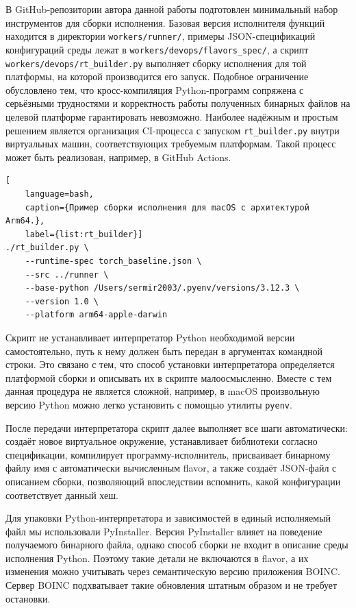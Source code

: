 \documentclass[a4paper,12pt]{extarticle}
\begin{document}
В GitHub-репозитории автора данной работы подготовлен минимальный набор инструментов для сборки исполнения.
Базовая версия исполнителя функций находится в директории \texttt{workers/runner/}, примеры JSON-спецификаций конфигураций среды лежат в \texttt{workers/devops/flavors\_spec/}, а скрипт \texttt{workers/devops/rt\_builder.py} выполняет сборку исполнения для той платформы, на которой производится его запуск.
Подобное ограничение обусловлено тем, что кросс-компиляция Python-программ сопряжена с серьёзными трудностями и корректность работы полученных бинарных файлов на целевой платформе гарантировать невозможно.
Наиболее надёжным и простым решением является организация CI-процесса с запуском \texttt{rt\_builder.py} внутри виртуальных машин, соответствующих требуемым платформам.
Такой процесс может быть реализован, например, в GitHub Actions.

\begin{lstlisting}[
    language=bash,
    caption={Пример сборки исполнения для macOS с архитектурой Arm64.},
    label={list:rt_builder}]
./rt_builder.py \
    --runtime-spec torch_baseline.json \
    --src ../runner \
    --base-python /Users/sermir2003/.pyenv/versions/3.12.3 \
    --version 1.0 \
    --platform arm64-apple-darwin
\end{lstlisting}

Скрипт не устанавливает интерпретатор Python необходимой версии самостоятельно, путь к нему должен быть передан в аргументах командной строки.
Это связано с тем, что способ установки интерпретатора определяется платформой сборки и описывать их в скрипте малоосмысленно.
Вместе с тем данная процедура не является сложной, например, в macOS произвольную версию Python можно легко установить с помощью утилиты \texttt{pyenv}.

После передачи интерпретатора скрипт далее выполняет все шаги автоматически: создаёт новое виртуальное окружение, устанавливает библиотеки согласно спецификации, компилирует программу-исполнитель, присваивает бинарному файлу имя с автоматически вычисленным flavor, а также создаёт JSON-файл с описанием сборки, позволяющий впоследствии вспомнить, какой конфигурации соответствует данный хеш.

Для упаковки Python-интерпретатора и зависимостей в единый исполняемый файл мы использовали PyInstaller.
Версия PyInstaller влияет на поведение получаемого бинарного файла, однако способ сборки не входит в описание среды исполнения Python.
Поэтому такие детали не включаются в flavor, а их изменения можно учитывать через семантическую версию приложения BOINC.
Сервер BOINC подхватывает такие обновления штатным образом и не требует остановки.
\end{document}
